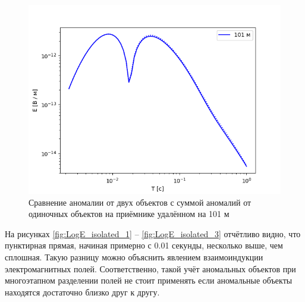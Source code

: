 \begin{figure}
	\centering
	\vspace*{0.7cm}
	\includegraphics[width=0.7\linewidth]{images/Log_E_compare_101.png}
	\caption{Сравнение аномалии от двух объектов с суммой аномалий от одиночных объектов на приёмнике удалённом на 101 м}
	\label{fig:LogE_isolated_4}
\end{figure} 

На рисунках \ref{fig:LogE_isolated_1} -- \ref{fig:LogE_isolated_3} отчётливо видно, что пунктирная прямая, начиная примерно с 0.01 секунды, несколько выше, чем сплошная. Такую разницу можно объяснить явлением взаимоиндукции электромагнитных полей. Соответственно, такой учёт аномальных объектов при многоэтапном разделении полей не стоит применять если аномальные объекты находятся достаточно близко друг к другу.
